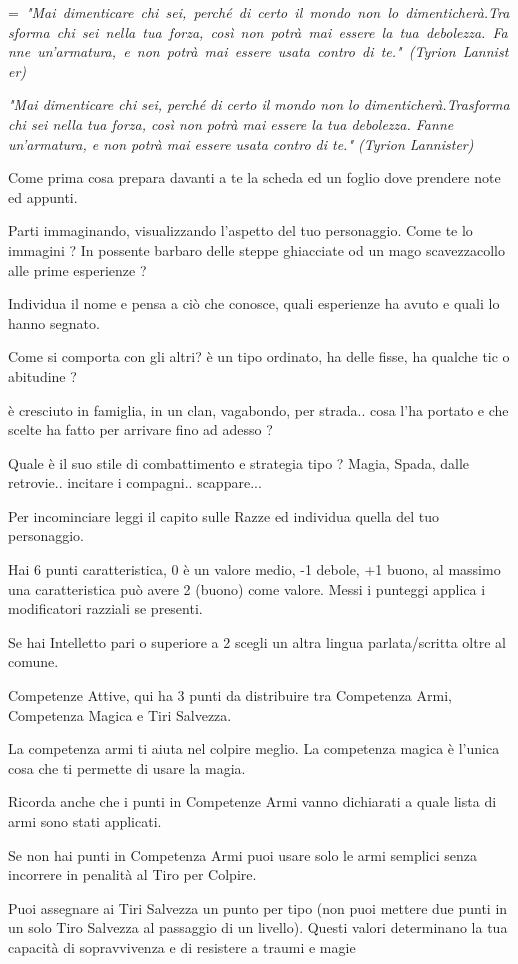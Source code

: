 \documentclass[a4paper,11pt,twoside,openany]{book}
\makeatletter
\newcommand{\mybox}[1]{%
	\setbox0=\hbox{#1}%
	\setlength{\@tempdima}{\dimexpr\wd0+13pt}%
	\begin{tcolorbox}[boxrule=0.5pt,arc=4pt, breakable,enhanced,
		left=6pt,right=6pt,top=6pt,bottom=6pt,boxsep=0pt,width=\@tempdima]
		#1
	\end{tcolorbox}
}
\makeatother
\begin{document}
\label{costruiamo-il-personaggio}
\mybox{\textit{
"Mai dimenticare chi sei, perché di certo il mondo non lo dimenticherà.Trasforma chi sei nella tua forza, così non potrà mai essere la tua debolezza. Fanne un'armatura, e non potrà mai essere usata contro di te." (Tyrion Lannister)
}}\medskip
	
Come prima cosa prepara davanti a te la scheda ed un foglio dove prendere note ed appunti.

Parti immaginando, visualizzando l'aspetto del tuo personaggio. Come te lo immagini ? In possente barbaro delle steppe ghiacciate od un mago scavezzacollo alle prime esperienze ?

Individua il nome e pensa a ciò che conosce, quali esperienze ha avuto e quali lo hanno segnato.

Come si comporta con gli altri? è un tipo ordinato, ha delle fisse, ha qualche tic o abitudine ?

è cresciuto in famiglia, in un clan, vagabondo, per strada.. cosa l'ha portato e che scelte ha fatto per arrivare fino ad adesso ?

Quale è il suo stile di combattimento e strategia tipo ? Magia, Spada, dalle retrovie.. incitare i compagni.. scappare...

Per incominciare leggi il capito sulle Razze ed individua quella del tuo personaggio.

Hai 6 punti caratteristica, 0 è un valore medio, -1 debole, +1 buono, al massimo una caratteristica può avere 2 (buono) come valore. Messi i punteggi applica i modificatori razziali se presenti.

Se hai Intelletto pari o superiore a 2 scegli un altra lingua parlata/scritta oltre al comune.

Competenze Attive, qui ha 3 punti da distribuire tra Competenza Armi, Competenza Magica e Tiri Salvezza.

La competenza armi ti aiuta nel colpire meglio. La competenza magica è l'unica cosa che ti permette di usare la magia.

Ricorda anche che i punti in Competenze Armi vanno dichiarati a quale lista di armi sono stati applicati.

Se non hai punti in Competenza Armi puoi usare solo le armi semplici senza incorrere in penalità al Tiro per Colpire.

Puoi assegnare ai Tiri Salvezza un punto per tipo (non puoi mettere due punti in un solo Tiro Salvezza al passaggio di un livello). Questi valori determinano la tua capacità di sopravvivenza e di resistere a traumi e magie
\end{document}
